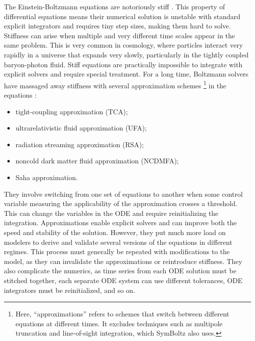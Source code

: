 \documentclass{aa}
\begin{document}
The Einstein-Boltzmann equations are notoriously stiff \citep{nadkarni-ghoshEinsteinBoltzmannEquationsRevisited2017}.
This property of differential equations means their numerical solution is unstable with standard explicit integrators and requires tiny step sizes, making them hard to solve.
Stiffness can arise when multiple and very different time scales appear in the same problem.
This is very common in cosmology, where particles interact very rapidly in a universe that expands very slowly, particularly in the tightly coupled baryon-photon fluid.
Stiff equations are practically impossible to integrate with explicit solvers and require special treatment.
For a long time, Boltzmann solvers have massaged away stiffness with several approximation schemes%
\footnote{Here, \enquote{approximations} refers to schemes that switch between different equations at different times. It excludes techniques such as multipole truncation and line-of-sight integration, which SymBoltz also uses.}
in the equations \citep[e.g.,][]{doranSpeedingCosmologicalBoltzmann2005,blasCosmicLinearAnisotropy2011a}:
\begin{itemize}
\item tight-coupling approximation (TCA);
\item ultrarelativistic fluid approximation (UFA);
\item radiation streaming approximation (RSA);
\item noncold dark matter fluid approximation (NCDMFA);
\item Saha approximation.
\end{itemize}

They involve switching from one set of equations to another when some control variable measuring the applicability of the approximation crosses a threshold.
This can change the variables in the ODE and require reinitializing the integration.
Approximations enable explicit solvers and can improve both the speed and stability of the solution.
However, they put much more load on modelers to derive and validate several versions of the equations in different regimes.
This process must generally be repeated with modifications to the model, as they can invalidate the approximations or reintroduce stiffness.
They also complicate the numerics, as time series from each ODE solution must be stitched together, each separate ODE system can use different tolerances, ODE integrators must be reinitialized, and so on.
\end{document}

